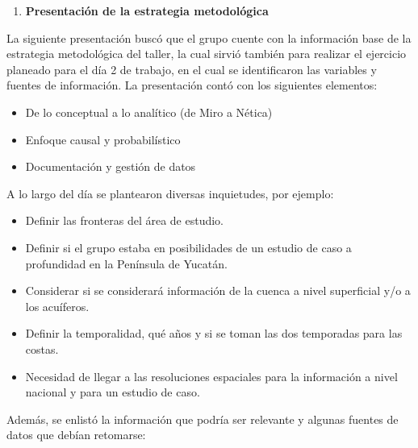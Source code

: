 \documentclass[
  letterpaper,
  DIV=11,
  numbers=noendperiod]{scrreprt}
\providecommand{\tightlist}{%
  \setlength{\itemsep}{0pt}\setlength{\parskip}{0pt}}\usepackage{longtable,booktabs,array}
\begin{document}
\begin{enumerate}
\def\labelenumi{\arabic{enumi}.}
\setcounter{enumi}{3}
\tightlist
\item
  \textbf{Presentación de la estrategia metodológica}
\end{enumerate}

La siguiente presentación buscó que el grupo cuente con la información
base de la estrategia metodológica del taller, la cual sirvió también
para realizar el ejercicio planeado para el día 2 de trabajo, en el cual
se identificaron las variables y fuentes de información. La presentación
contó con los siguientes elementos:

\begin{itemize}
\item
  De lo conceptual a lo analítico (de Miro a Nética)
\item
  Enfoque causal y probabilístico
\item
  Documentación y gestión de datos
\end{itemize}

A lo largo del día se plantearon diversas inquietudes, por ejemplo:

\begin{itemize}
\item
  Definir las fronteras del área de estudio.
\item
  Definir si el grupo estaba en posibilidades de un estudio de caso a
  profundidad en la Península de Yucatán.
\item
  Considerar si se considerará información de la cuenca a nivel
  superficial y/o a los acuíferos.
\item
  Definir la temporalidad, qué años y si se toman las dos temporadas
  para las costas.
\item
  Necesidad de llegar a las resoluciones espaciales para la información
  a nivel nacional y para un estudio de caso.
\end{itemize}

Además, se enlistó la información que podría ser relevante y algunas
fuentes de datos que debían retomarse:
\end{document}
